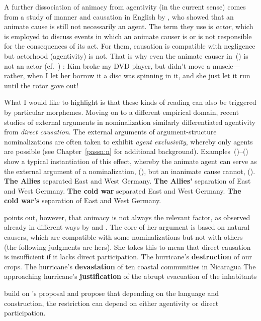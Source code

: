 A further dissociation of animacy from agentivity (in the current sense) comes from a study of manner and causation in English by \cite{beaverskoontzgarboden12}, who showed that an animate cause is still not necessarily an agent. The term they use is \emph{actor}, which is employed to discuss events in which an animate causer is or is not responsible for the consequences of its act. For them, causation is compatible with negligence but actorhood (agentivity) is not. That is why even the animate causer in~(\nextx) is not an actor (cf.~\citealt{rappaporthovav14}) :
\ex Kim broke my DVD player, but didn’t move a muscle—rather, when I let her borrow it a disc was spinning in it, and she just let it run until the rotor gave out!
\xe

What I would like to highlight is that these kinds of reading can also be triggered by particular morphemes. Moving on to a different empirical domain, recent studies of external arguments in nominalization \citep{sichel10n,alexiadouetal13,ahdout18nom} similarly differentiated agentivity from \emph{direct causation}. The external arguments of argument-structure nominalizations are often taken to exhibit \emph{agent exclusivity}, whereby only agents are possible (see Chapter~\ref{passn:n} for additional background). Examples~(\nextx)--(\anextx) show a typical instantiation of this effect, whereby the animate agent can serve as the external argument of a nominalization, (\nextx), but an inanimate cause cannot, (\anextx).
\pex
	\a \textbf{The Allies} separated East and West Germany.
	\a \textbf{The Allies'} separation of East and West Germany.
\xe
\pex
	\a \textbf{The cold war} separated East and West Germany.
	\a \ljudge{\#}\textbf{The cold war's} separation of East and West Germany.
\xe

\cite{sichel10n} points out, however, that animacy is not always the relevant factor, as observed already in different ways by \cite{pesetsky95} and \cite{marantz97}. The core of her argument is based on natural causers, which are compatible with some nominalizations but not with others (the following judgments are hers). She takes this to mean that direct causation is insufficient if it lacks direct participation.
\pex
	\a The hurricane's \textbf{destruction} of our crops.
	\a The hurricane's \textbf{devastation} of ten coastal communities in Nicaragua
\xe
\ex \ljudge{\#} The approaching hurricane's \textbf{justification} of the abrupt evacuation of the inhabitants
\xe

\cite{alexiadouetal13,alexiadouetal13jcgl} build on \citeauthor{sichel10n}'s proposal and propose that depending on the language and construction, the restriction can depend on either agentivity or direct participation.

